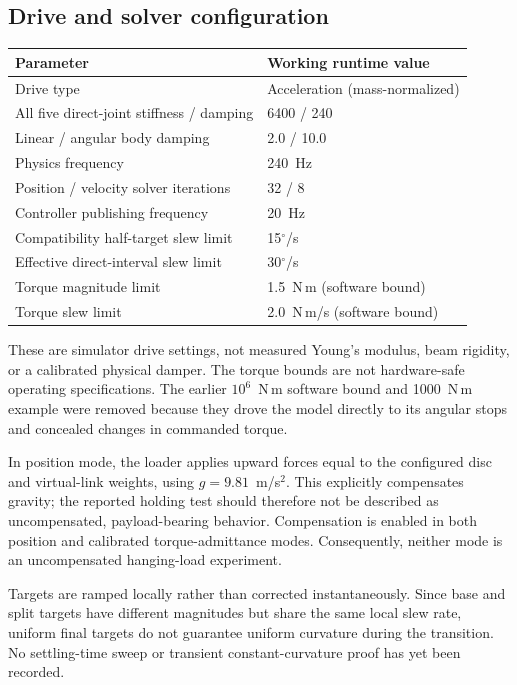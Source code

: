 \documentclass[11pt,letterpaper]{article}
\newcommand{\degrees}{\ensuremath{^{\circ}}}
\begin{document}
\subsection{Drive and solver configuration}
\begin{center}
\begin{tabular}{ll}
\toprule
Parameter & Working runtime value\\\midrule
Drive type & Acceleration (mass-normalized)\\
All five direct-joint stiffness / damping & 6400 / 240\\
Linear / angular body damping & 2.0 / 10.0\\
Physics frequency & 240~Hz\\
Position / velocity solver iterations & 32 / 8\\
Controller publishing frequency & 20~Hz\\
Compatibility half-target slew limit & 15\degrees{}/s\\
Effective direct-interval slew limit & 30\degrees{}/s\\
Torque magnitude limit & 1.5~N\,m (software bound)\\
Torque slew limit & 2.0~N\,m/s (software bound)\\
\bottomrule
\end{tabular}
\end{center}
These are simulator drive settings, not measured Young's modulus, beam
rigidity, or a calibrated physical damper. The torque bounds are not
hardware-safe operating specifications. The earlier $10^6$~N\,m software
bound and 1000~N\,m example were removed because they drove the model directly
to its angular stops and concealed changes in commanded torque.

In position mode, the loader applies upward forces equal to the configured
disc and virtual-link weights, using $g=9.81$~m/s$^2$. This explicitly
compensates gravity; the reported holding test should therefore not be
described as uncompensated, payload-bearing behavior. Compensation is enabled
in both position and calibrated torque-admittance modes. Consequently, neither
mode is an uncompensated hanging-load experiment.

Targets are ramped locally rather than corrected instantaneously. Since base
and split targets have different magnitudes but share the same local slew
rate, uniform final targets do not guarantee uniform curvature during the
transition. No settling-time sweep or transient constant-curvature proof
has yet been recorded.
\end{document}
